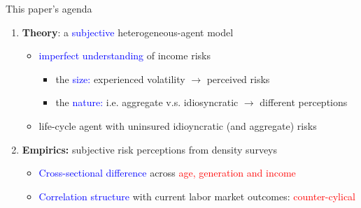 \documentclass{beamer}
\begin{document}
\begin{frame}{This paper's agenda}
	\begin{enumerate}
			\item \textbf{Theory}: a \textcolor{blue}{subjective} heterogeneous-agent model 
		\begin{itemize}
			\item  \textcolor{blue}{imperfect understanding} of income risks
			\begin{itemize}
				\item the \textcolor{blue}{size:} experienced volatility $\rightarrow$  perceived risks
				\item the \textcolor{blue}{nature:} i.e.  aggregate v.s. idiosyncratic  $\rightarrow$ different perceptions
			\end{itemize}
			\item life-cycle agent with uninsured idioyncratic (and aggregate) risks
		\end{itemize} 
		\item \textbf{Empirics:} subjective risk perceptions from density surveys
		\begin{itemize}
			\item \textcolor{blue}{Cross-sectional difference} across \textcolor{red}{age, generation and income} 
			\item \textcolor{blue}{Correlation structure} with current labor market outcomes: \textcolor{red}{counter-cylical} 
		\end{itemize}
	
	\end{enumerate}
\end{frame}
\end{document}
